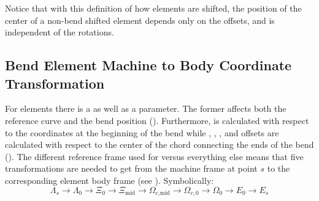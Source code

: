 Notice that with this definition of how elements are shifted, the position of the center of a
non-bend shifted element depends only on the offsets, and is independent of the rotations.

\subsection{Bend Element Machine to Body Coordinate Transformation}
\label{s:bend.mis}

For  elements there is a  as well as a  parameter.
The former affects both the reference curve and
the bend position (). Furthermore,  is calculated with respect to
the coordinates at the beginning of the bend while , ,
, and offsets are calculated with respect to the center of the chord connecting the
ends of the bend (). 
The different reference frame used
for  versus everything else means that five transformations are needed to get from the
machine frame at point $s$ to the corresponding element body frame (see ). Symbolically:
\begin{equation}
  \Lambda_s \longrightarrow \Lambda_0 \longrightarrow
  \Xi_0 \longrightarrow \Xi_\text{mid} \longrightarrow 
  \Omega_\text{c,mid} \longrightarrow \Omega_{c,0} \longrightarrow 
  \Omega_{0} \longrightarrow E_0 \longrightarrow E_s
\end{equation}


